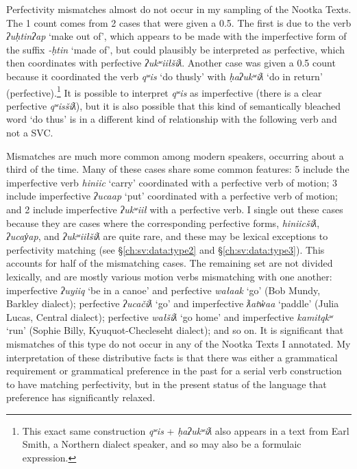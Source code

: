 Perfectivity mismatches almost do not occur in my sampling of the Nootka Texts. The 1 count comes from 2 cases that were given a 0.5. The first is due to the verb \textit{ʔuḥtinʔap} `make out of', which appears to be made with the imperfective form of the suffix \textit{-ḥtin} `made of', but could plausibly be interpreted as perfective, which then coordinates with perfective \textit{ʔukʷiiłšiƛ}. Another case was given a 0.5 count because it coordinated the verb \textit{qʷis} `do thusly' with \textit{ḥaʔukʷiƛ} `do in return' (perfective).\footnote{This exact same construction \textit{qʷis} + \textit{ḥaʔukʷiƛ} also appears in a text from Earl Smith, a Northern dialect speaker, and so may also be a formulaic expression.} It is possible to interpret \textit{qʷis} as imperfective (there is a clear perfective \textit{qʷisšiƛ}), but it is also possible that this kind of semantically bleached word `do thus' is in a different kind of relationship with the following verb and not a SVC.

Mismatches are much more common among modern speakers, occurring about a third of the time. Many of these cases share some common features: 5 include the imperfective verb \textit{hiniic} `carry' coordinated with a perfective verb of motion; 3 include imperfective \textit{ʔucaap} `put' coordinated with a perfective verb of motion; and 2 include imperfective \textit{ʔukʷiił} with a perfective verb. I single out these cases because they are cases where the corresponding perfective forms, \textit{hiniicšiƛ}, \textit{ʔucay̓ap}, and \textit{ʔukʷiiłšiƛ} are quite rare, and these may be lexical exceptions to perfectivity matching (see \S\ref{ch:sv:data:type2} and \S\ref{ch:sv:data:type3}). This accounts for half of the mismatching cases. The remaining set are not divided lexically, and are mostly various motion verbs mismatching with one another: imperfective \textit{ʔuyiiq} `be in a canoe' and perfective \textit{wałaak} `go' (Bob Mundy, Barkley dialect); perfective \textit{ʔucačiƛ} `go' and imperfective \textit{ƛatw̓aa} `paddle' (Julia Lucas, Central dialect); perfective \textit{wałšiƛ} `go home' and imperfective \textit{kamitqkʷ} `run' (Sophie Billy, Kyuquot-Checleseht dialect); and so on. It is significant that mismatches of this type do not occur in any of the Nootka Texts I annotated. My interpretation of these distributive facts is that there was either a grammatical requirement or grammatical preference in the past for a serial verb construction to have matching perfectivity, but in the present status of the language that preference has significantly relaxed.

